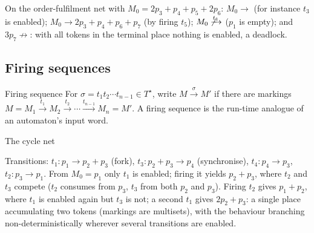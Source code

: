On the order-fulfilment net with $M_0 = 2p_3 + p_4 + p_5 + 2p_6$: $M_0 \to$ (for instance $t_3$ is enabled); $M_0 \to 2p_3 + p_4 + p_6 + p_7$ (by firing $t_5$); $M_0 \not\xrightarrow{t_1}$ ($p_1$ is empty); and $3p_7 \not\to$: with all tokens in the terminal place nothing is enabled, a deadlock.

\subsection{Firing sequences}

\begin{definitionbox}{Firing sequence}
For $\sigma = t_1 t_2 \cdots t_{n-1} \in T^\star$, write $M \xrightarrow{\sigma} M'$ if there are markings $M = M_1 \xrightarrow{t_1} M_2 \xrightarrow{t_2} \cdots \xrightarrow{t_{n-1}} M_n = M'$. A firing sequence is the run-time analogue of an automaton's input word.
\end{definitionbox}

\begin{examplebox}{The cycle net}
\begin{center}
\end{center}
Transitions: $t_1 : p_1 \to p_2 + p_3$ (fork), $t_3 : p_2 + p_3 \to p_4$ (synchronise), $t_4 : p_4 \to p_3$, $t_2 : p_3 \to p_1$. From $M_0 = p_1$ only $t_1$ is enabled; firing it yields $p_2 + p_3$, where $t_2$ and $t_3$ compete ($t_2$ consumes from $p_3$, $t_3$ from both $p_2$ and $p_3$). Firing $t_2$ gives $p_1 + p_2$, where $t_1$ is enabled again but $t_3$ is not; a second $t_1$ gives $2p_2 + p_3$: a single place accumulating two tokens (markings are multisets), with the behaviour branching non-deterministically wherever several transitions are enabled.
\end{examplebox}

